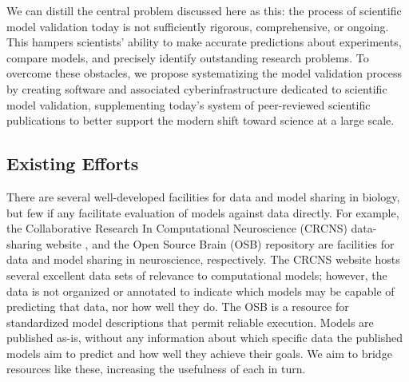 \documentclass[11pt,letterpaper]{article}
\begin{document}
We can distill the central problem discussed here as this: the process of scientific model validation today is not sufficiently rigorous, comprehensive, or ongoing. This hampers scientists' ability to make accurate predictions about experiments, compare models, and precisely identify outstanding research problems. To overcome these obstacles, we propose systematizing the model validation process by creating software and associated cyberinfrastructure dedicated to scientific model validation, supplementing today's system of peer-reviewed scientific publications to better support the modern shift toward science at a large scale.

\subsection{Existing Efforts}\label{sec:existing_efforts}
There are several well-developed facilities for data and model sharing in biology, but few if any facilitate evaluation of models against data directly.  For example, the Collaborative Research In Computational Neuroscience (CRCNS) data-sharing website \cite{crcns_url}, and the Open Source Brain (OSB) repository \cite{osb_url} are facilities for data and model sharing in neuroscience, respectively.  The CRCNS website hosts several excellent data sets of relevance to computational models; however, the data is not organized or annotated to indicate which models may be capable of predicting that data, nor how well they do.  The OSB is a resource for standardized model descriptions that permit reliable execution. Models are published as-is, without any information about which specific data the published models aim to predict and how well they achieve their goals. We aim to bridge resources like these, increasing the usefulness of each in turn.
\end{document}

